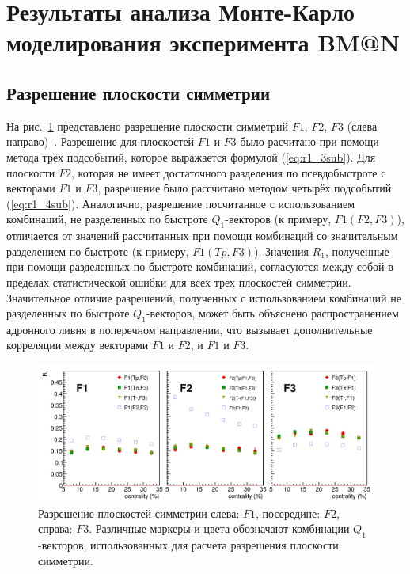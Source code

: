 \section{Результаты анализа Монте-Карло моделирования эксперимента BM@N}

\subsection{Разрешение плоскости симметрии}

На рис.~\ref{fig:bmn_combinations} представлено разрешение плоскости симметрий $F1$, $F2$, $F3$ (слева направо)~\cite{Mamaev:2023yhz,Mamaev:2024}. 
Разрешение для плоскостей $F1$ и $F3$ было расчитано при помощи метода трёх подсобытий, которое выражается формулой (\ref{eq:r1_3sub}).
Для плоскости $F2$, которая не имеет достаточного разделения по псевдобыстроте с векторами $F1$ и $F3$, разрешение было рассчитано методом четырёх подсобытий (\ref{eq:r1_4sub}).
Аналогично, разрешение посчитанное с использованием комбинаций, не разделенных по быстроте $Q_1$-векторов (к примеру, $F1(F2,F3)$), отличается от значений рассчитанных при помощи комбинаций со значительным разделением по быстроте (к примеру, $F1(Tp,F3)$).
Значения $R_1$, полученные при помощи разделенных по быстроте комбинаций, согласуются между собой в пределах статистической ошибки для всех трех плоскостей симметрии. 
Значительное отличие разрешений, полученных с использованием комбинаций не разделенных по быстроте $Q_1$-векторов, может быть объяснено распространением адронного ливня в поперечном направлении, что вызывает дополнительные корреляции между векторами $F1$ и $F2$, и $F1$ и $F3$.
%
\begin{figure}[ht]
\begin{center}
\includegraphics[width=0.95\linewidth]{images/R1_F123_combinations_centrality.png}
\caption{Разрешение плоскостей симметрии слева: $F1$, посередине: $F2$, справа: $F3$. Различные маркеры и цвета обозначают комбинации $Q_1$-векторов, использованных для расчета разрешения плоскости симметрии.}
\label{fig:bmn_combinations}
\end{center}
\end{figure}

